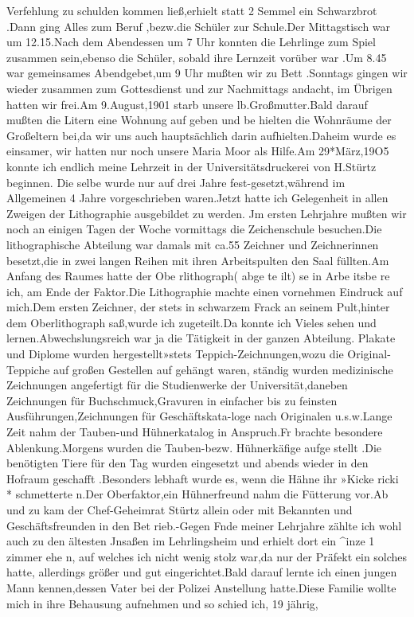 \documentclass[a4paper,11pt]{article}
\begin{document}
  Verfehlung zu schulden kommen ließ,erhielt statt 2 Semmel ein Schwarzbrot .Dann ging Alles zum Beruf ,bezw.die Schüler zur Schule.Der Mittagstisch war um 12.15.Nach dem Abendessen um 7 Uhr konnten die Lehrlinge zum Spiel zusammen sein,ebenso die Schüler, sobald ihre Lernzeit vorüber war .Um 8.45 war gemeinsames Abendgebet,um 9 Uhr mußten wir zu Bett .Sonntags gingen wir wieder zusammen zum Gottesdienst und zur Nachmittags andacht, im Übrigen hatten wir frei.Am 9.August,1901 starb unsere lb.Großmutter.Bald darauf mußten die Litern eine Wohnung auf geben und be hielten die Wohnräume der Großeltern bei,da wir uns auch hauptsächlich darin aufhielten.Daheim wurde es einsamer, wir hatten nur noch unsere Maria Moor als Hilfe.Am 29*März,19O5 konnte ich endlich meine Lehrzeit in der Universitätsdruckerei von H.Stürtz beginnen. Die selbe wurde nur auf drei Jahre fest-gesetzt,während im Allgemeinen 4 Jahre vorgeschrieben waren.Jetzt hatte ich Gelegenheit in allen Zweigen der Lithographie ausgebildet zu werden. Jm ersten Lehrjahre mußten wir noch an einigen Tagen der Woche vormittags die Zeichenschule besuchen.Die lithographische Abteilung war damals mit ca.55 Zeichner und Zeichnerinnen besetzt,die in zwei langen Reihen mit ihren Arbeitspulten den Saal füllten.Am Anfang des Raumes hatte der Obe rlithograph( abge te ilt) se in Arbe itsbe re ich, am Ende der Faktor.Die Lithographie machte einen vornehmen Eindruck auf mich.Dem ersten Zeichner, der stets in schwarzem Frack an seinem Pult,hinter dem Oberlithograph saß,wurde ich zugeteilt.Da konnte ich Vieles sehen und lernen.Abwechslungsreich war ja die Tätigkeit in der ganzen Abteilung. Plakate und Diplome wurden hergestellt»stets Teppich-Zeichnungen,wozu die Original-Teppiche auf großen Gestellen auf gehängt waren, ständig wurden medizinische Zeichnungen angefertigt für die Studienwerke der Universität,daneben Zeichnungen für Buchschmuck,Gravuren in einfacher bis zu feinsten Ausführungen,Zeichnungen für Geschäftskata-loge nach Originalen u.s.w.Lange Zeit nahm der Tauben-und Hühnerkatalog in Anspruch.Fr brachte besondere Ablenkung.Morgens wurden die Tauben-bezw. Hühnerkäfige aufge stellt .Die benötigten Tiere für den Tag wurden eingesetzt und abends wieder in den Hofraum geschafft .Besonders lebhaft wurde es, wenn die Hähne ihr »Kicke ricki * schmetterte n.Der Oberfaktor,ein Hühnerfreund nahm die Fütterung vor.Ab und zu kam der Chef-Geheimrat Stürtz allein oder mit Bekannten und Geschäftsfreunden in den Bet rieb.-Gegen Fnde meiner Lehrjahre zählte ich wohl auch zu den ältesten Jnsaßen im Lehrlingsheim und erhielt dort ein ^inze 1 zimmer ehe n, auf welches ich nicht wenig stolz war,da nur der Präfekt ein solches hatte, allerdings größer und gut eingerichtet.Bald darauf lernte ich einen jungen Mann kennen,dessen Vater bei der Polizei Anstellung hatte.Diese Familie wollte mich in ihre Behausung aufnehmen und so schied ich, 19 jährig,
\end{document}
